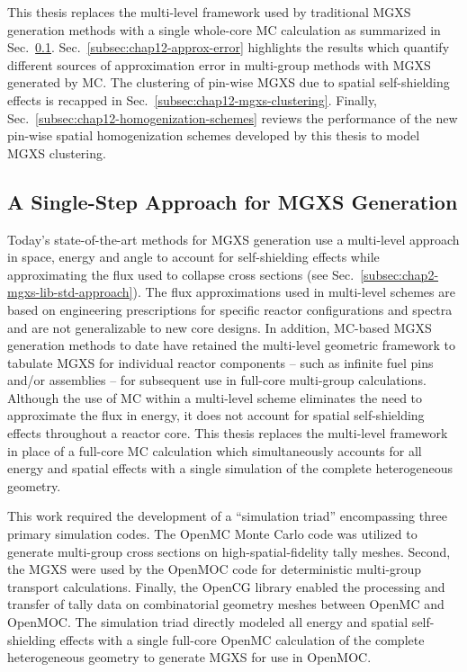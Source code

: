 This thesis replaces the multi-level framework used by traditional \ac{MGXS} generation methods with a single whole-core MC calculation as summarized in Sec.~\ref{subsec:chap12-single-step}. Sec.~\ref{subsec:chap12-approx-error} highlights the results which quantify different sources of approximation error in multi-group methods with \ac{MGXS} generated by \ac{MC}. The clustering of pin-wise \ac{MGXS} due to spatial self-shielding effects is recapped in Sec.~\ref{subsec:chap12-mgxs-clustering}. Finally, Sec.~\ref{subsec:chap12-homogenization-schemes} reviews the performance of the new pin-wise spatial homogenization schemes developed by this thesis to model \ac{MGXS} clustering.

\subsection{A Single-Step Approach for MGXS Generation}
\label{subsec:chap12-single-step}

Today's state-of-the-art methods for \ac{MGXS} generation use a multi-level approach in space, energy and angle to account for self-shielding effects while approximating the flux used to collapse cross sections (see Sec.~\ref{subsec:chap2-mgxs-lib-std-approach}). The flux approximations used in multi-level schemes are based on engineering prescriptions for specific reactor configurations and spectra and are not generalizable to new core designs. In addition, \ac{MC}-based \ac{MGXS} generation methods to date have retained the multi-level geometric framework to tabulate MGXS for individual reactor components -- such as infinite fuel pins and/or assemblies -- for subsequent use in full-core multi-group calculations. Although the use of MC within a multi-level scheme eliminates the need to approximate the flux in energy, it does not account for spatial self-shielding effects throughout a reactor core. This thesis replaces the multi-level framework in place of a full-core \ac{MC} calculation which simultaneously accounts for all energy and spatial effects with a single simulation of the complete heterogeneous geometry.

This work required the development of a ``simulation triad'' encompassing three primary simulation codes. The OpenMC Monte Carlo code was utilized to generate multi-group cross sections on high-spatial-fidelity tally meshes. Second, the \ac{MGXS} were used by the OpenMOC code for deterministic multi-group transport calculations. Finally, the OpenCG library enabled the processing and transfer of tally data on combinatorial geometry meshes between OpenMC and OpenMOC. The simulation triad directly modeled all energy and spatial self-shielding effects with a single full-core OpenMC calculation of the complete heterogeneous geometry to generate \ac{MGXS} for use in OpenMOC.

